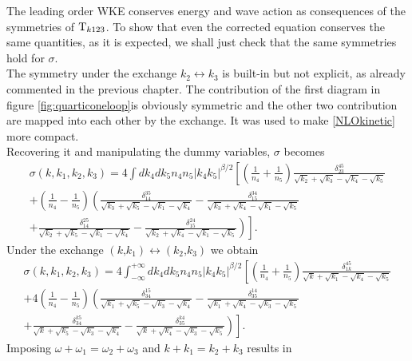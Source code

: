     The leading order WKE conserves energy and wave action as consequences of the symmetries of $\mathrm{T}_{k123}$. To show that even the corrected equation 
    conserves the same quantities, as it is expected, we shall just check that the same symmetries hold for $\sigma$.\\
    The symmetry under the exchange $k_2 \leftrightarrow k_3$ is built-in but not explicit, as already commented in the previous chapter. The contribution of the 
    first diagram in figure \ref{fig:quarticoneloop}is obviously symmetric and the other two contribution are mapped into each other by the exchange. It was used to make
    \eqref{NLOkinetic} more compact. \\
    Recovering it and manipulating the dummy variables, 
    $\sigma$ becomes
    \begin{multline}
      \sigma(k,k_1,k_2,k_3) =  4 \int dk_4dk_5n_4n_5|k_4k_5|^{\beta/2} 
       \left[\left( \frac{1}{n_4}+\frac{1}{n_5} \right) 
      \frac{\delta_{23}^{45}}{\sqrt{k_2}+\sqrt{k_3}-\sqrt{k_4}-\sqrt{k_5}} \right. \\
      + \left( \frac{1}{n_4}-\frac{1}{n_5} \right) \left(\frac{\delta_{14}^{35}}{\sqrt{k_3}+\sqrt{k_5}-\sqrt{k_1}-\sqrt{k_4}} - \frac{\delta_{15}^{34}}{\sqrt{k_3} 
       +\sqrt{k_4}-\sqrt{k_1}-\sqrt{k_5}}  \right. \\
      \left. \left. +\frac{\delta_{14}^{25}}{\sqrt{k_2}+\sqrt{k_5}-\sqrt{k_1}-\sqrt{k_4}} -\frac{\delta_{15}^{24}}{\sqrt{k_2}
      +\sqrt{k_4}-\sqrt{k_1}-\sqrt{k_5}}\right)\right].
    \end{multline}
    Under the exchange $(k \text{,} k_1) \leftrightarrow (k_2 \text{,} k_3)$  we obtain
    \begin{multline*}
      \sigma(k,k_1,k_2,k_3) =  4 \int_{-\infty}^{+\infty}dk_4dk_5n_4n_5|k_4k_5|^{\beta/2} 
       \left[\left( \frac{1}{n_4}+\frac{1}{n_5} \right) 
      \frac{\delta_{1k}^{45}}{\sqrt{k}+\sqrt{k_1}-\sqrt{k_4}-\sqrt{k_5}} \right. \\
      + 4\left( \frac{1}{n_4}-\frac{1}{n_5} \right) 
      \left(\frac{\delta_{34}^{15}}{\sqrt{k_1}+\sqrt{k_5}-\sqrt{k_3}-\sqrt{k_4}} - \frac{\delta_{35}^{14}}{\sqrt{k_1} +\sqrt{k_4}-\sqrt{k_3}-\sqrt{k_5}}  \right. \\
      \left. \left. +\frac{\delta_{34}^{k5}}{\sqrt{k}+\sqrt{k_5}-\sqrt{k_3}-\sqrt{k_4}} -\frac{\delta_{35}^{k4}}{\sqrt{k}+\sqrt{k_4}-\sqrt{k_3}-\sqrt{k_5}}\right)\right].
    \end{multline*}
    Imposing $\omega + \omega_1 = \omega_2 +\omega_3$ and $k + k_1 = k_2 + k_3$ results in
